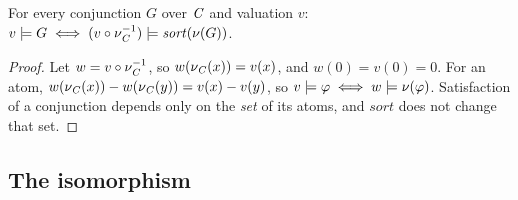 \begin{lemma}\label{lem:constraint}
For every conjunction $G$ over $\mathit{C}$ and valuation $v$:
$v\models G \iff (v\circ\nu_{\mathit{C}}^{-1})\models\mathit{sort}(\nu(G))$.
\end{lemma}
\begin{proof}
Let $w=v\circ\nu_{\mathit{C}}^{-1}$, so $w(\nu_{\mathit{C}}(x))=v(x)$, and $w(0)=v(0)=0$. For an atom,
$w(\nu_{\mathit{C}}(x))-w(\nu_{\mathit{C}}(y))=v(x)-v(y)$, so $v\models\varphi\iff w\models\nu(\varphi)$.
Satisfaction of a conjunction depends only on the \emph{set} of its atoms, and
$\mathit{sort}$ does not change that set.
\end{proof}

\subsection{The isomorphism}

